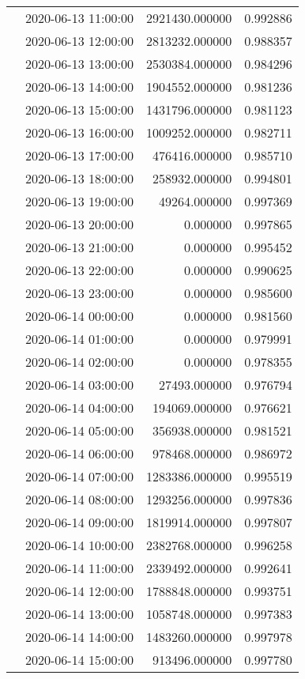 \begin{tabular}{llrr}
 & 2020-06-13 11:00:00 & 2921430.000000 & 0.992886 \\
 & 2020-06-13 12:00:00 & 2813232.000000 & 0.988357 \\
 & 2020-06-13 13:00:00 & 2530384.000000 & 0.984296 \\
 & 2020-06-13 14:00:00 & 1904552.000000 & 0.981236 \\
 & 2020-06-13 15:00:00 & 1431796.000000 & 0.981123 \\
 & 2020-06-13 16:00:00 & 1009252.000000 & 0.982711 \\
 & 2020-06-13 17:00:00 & 476416.000000 & 0.985710 \\
 & 2020-06-13 18:00:00 & 258932.000000 & 0.994801 \\
 & 2020-06-13 19:00:00 & 49264.000000 & 0.997369 \\
 & 2020-06-13 20:00:00 & 0.000000 & 0.997865 \\
 & 2020-06-13 21:00:00 & 0.000000 & 0.995452 \\
 & 2020-06-13 22:00:00 & 0.000000 & 0.990625 \\
 & 2020-06-13 23:00:00 & 0.000000 & 0.985600 \\
 & 2020-06-14 00:00:00 & 0.000000 & 0.981560 \\
 & 2020-06-14 01:00:00 & 0.000000 & 0.979991 \\
 & 2020-06-14 02:00:00 & 0.000000 & 0.978355 \\
 & 2020-06-14 03:00:00 & 27493.000000 & 0.976794 \\
 & 2020-06-14 04:00:00 & 194069.000000 & 0.976621 \\
 & 2020-06-14 05:00:00 & 356938.000000 & 0.981521 \\
 & 2020-06-14 06:00:00 & 978468.000000 & 0.986972 \\
 & 2020-06-14 07:00:00 & 1283386.000000 & 0.995519 \\
 & 2020-06-14 08:00:00 & 1293256.000000 & 0.997836 \\
 & 2020-06-14 09:00:00 & 1819914.000000 & 0.997807 \\
 & 2020-06-14 10:00:00 & 2382768.000000 & 0.996258 \\
 & 2020-06-14 11:00:00 & 2339492.000000 & 0.992641 \\
 & 2020-06-14 12:00:00 & 1788848.000000 & 0.993751 \\
 & 2020-06-14 13:00:00 & 1058748.000000 & 0.997383 \\
 & 2020-06-14 14:00:00 & 1483260.000000 & 0.997978 \\
 & 2020-06-14 15:00:00 & 913496.000000 & 0.997780 \\

\end{tabular}
